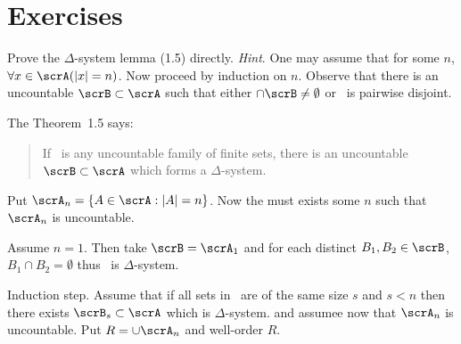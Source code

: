 \section{Exercises}

\begin{enumerate}

\begin{excopy}
Prove the \(\Delta\)-system lemma (1.5) directly. 
\emph{Hint}. One may assume that for
some $n$, \(\forall x \in \scrA (|x| =n)\). 
Now proceed by induction on $n$. Observe that
there is an uncountable \(\scrB \subset \scrA\) such that either 
\(\cap \scrB \neq \emptyset\) or \scrB\ is pairwise
disjoint.
\end{excopy}

The Theorem~1.5 says:
\begin{quote}
If \scrA\ is any uncountable family of finite sets, there is an uncountable
\(\scrB \subset \scrA\) which forms a \(\Delta\)-system.
\end{quote}
Put \(\scrA_n = \{A \in \scrA: |A|=n\}\).
Now the must exists some $n$ such that \(\scrA_n\) is uncountable.

Assume \(n=1\). Then take \(\scrB = \scrA_1\) 
and for each distinct \(B_1,B_2 \in \scrB\), \(B_1\cap B_2 = \emptyset\)
thus \scrB\ is \(\Delta\)-system.

Induction step.
Assume that if all sets in \scrA\ are of the same size $s$ and \(s<n\)
then there exists \(\scrB_s\subset \scrA\) which is \(\Delta\)-system.
and assumee now that \(\scrA_n\) is uncountable.
Put \(R = \cup \scrA_n\) and well-order $R$.

\unfinished


\end{enumerate}
